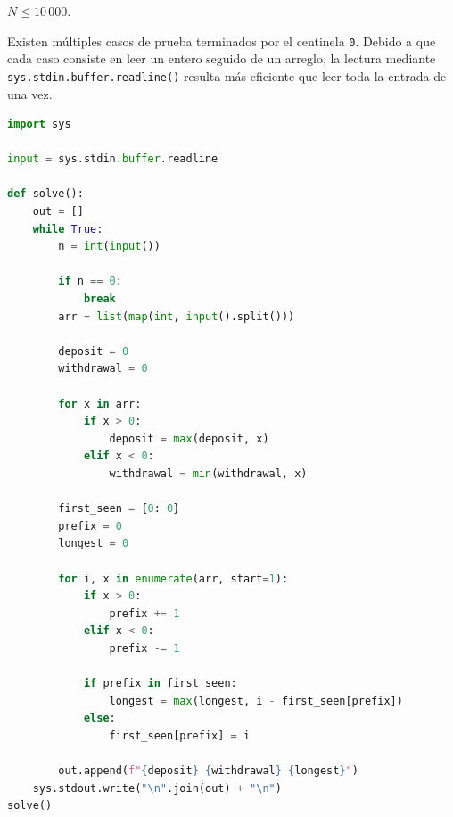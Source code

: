 
$N \le 10\,000$.

Existen múltiples casos de prueba terminados por el centinela \texttt{0}. Debido a que cada caso consiste en leer un entero seguido de un arreglo, la lectura mediante \texttt{sys.stdin.buffer.readline()} resulta más eficiente que leer toda la entrada de una vez.


\begin{lstlisting}[language=Python]
import sys

input = sys.stdin.buffer.readline

def solve():
    out = []
    while True:
        n = int(input())

        if n == 0:
            break
        arr = list(map(int, input().split()))

        deposit = 0
        withdrawal = 0

        for x in arr:
            if x > 0:
                deposit = max(deposit, x)
            elif x < 0:
                withdrawal = min(withdrawal, x)

        first_seen = {0: 0}
        prefix = 0
        longest = 0

        for i, x in enumerate(arr, start=1):
            if x > 0:
                prefix += 1
            elif x < 0:
                prefix -= 1

            if prefix in first_seen:
                longest = max(longest, i - first_seen[prefix])
            else:
                first_seen[prefix] = i

        out.append(f"{deposit} {withdrawal} {longest}")
    sys.stdout.write("\n".join(out) + "\n")
solve()
\end{lstlisting}